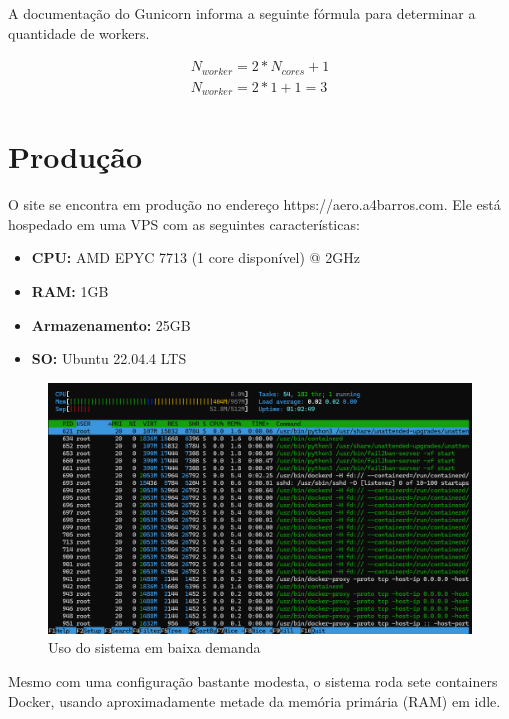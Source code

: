 A documentação do Gunicorn informa a seguinte fórmula para determinar a quantidade de workers. \cite{number-work}

\begin{equation} 
    \begin{split}
        N_{worker} = 2 * N_{cores} + 1 \\
        N_{worker} = 2 * 1 + 1 = 3 
    \end{split}
\end{equation}

\section{Produção}
O site se encontra em produção no endereço https://aero.a4barros.com. Ele está hospedado em uma VPS
com as seguintes características:

\begin{itemize}
    \item \textbf{CPU:} AMD EPYC 7713 (1 core disponível) @ 2GHz
    \item \textbf{RAM:} 1GB
    \item \textbf{Armazenamento:} 25GB
    \item \textbf{SO:} Ubuntu 22.04.4 LTS
\end{itemize}

\begin{figure}[ht]
    \begin{center}
    \includegraphics[width=400pt]{img/prod-idle.png}
    \caption{Uso do sistema em baixa demanda}
    \label{fig:prod-idle}
    \end{center}
\end{figure}

Mesmo com uma configuração bastante modesta, o sistema roda sete containers Docker, usando 
aproximadamente metade da memória primária (RAM) em idle.

